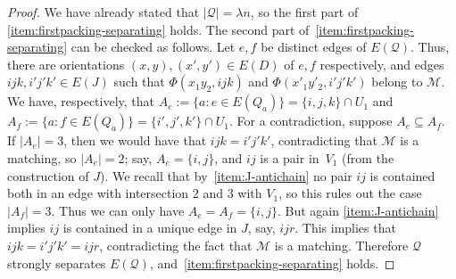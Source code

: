 \documentclass[a4paper, 11pt,reqno]{amsart}
\newcommand{\calQ}{\mathcal{Q}}
\theoremstyle{plain}
\theoremstyle{definition}
\numberwithin{equation}{section}
\begin{document}
\begin{proof}
We have already stated that $|\mathcal{Q}| = \lambda n$, so the first part of \ref{item:firstpacking-separating} holds.
The second part of~\ref{item:firstpacking-separating} can be checked as follows.
Let $e, f$ be distinct edges of $E(\calQ)$. Thus, there are orientations
$(x,y), (x',y') \in E(D)$ of $e, f$ respectively, and edges $ijk, i'j'k' \in E(J)$ 
such that $\Phi(x_1 y_2, ijk)$ and $\Phi(x'_1 y'_2, i'j'k')$ belong to $\mathcal{M}$.  
We have, respectively, that $A_e := \{ a : e \in E(Q_a) \} = \{i, j, k\} \cap U_1$
and $A_f := \{ a : f \in E(Q_a) \} = \{i', j', k'\} \cap U_1$.
For a contradiction, suppose $A_e \subseteq A_f$. If $|A_e| = 3$, then 
we would have that $ijk = i'j'k'$, contradicting that $\mathcal{M}$ 
is a matching, so $|A_e| = 2$; say, $A_e = \{i, j\}$, and $ij$ is a
pair in~$V_1$ (from the construction of $J$).  We recall that
by~\ref{item:J-antichain} no pair $ij$ is contained both in an edge
with intersection $2$ and $3$ with $V_1$, so this rules out the case
$|A_f| = 3$.  Thus we can only have $A_e = A_f = \{i,j\}$.  But
again \ref{item:J-antichain} implies $ij$ is contained in a unique
edge in $J$, say, $ijr$.  This implies that $ijk = i'j'k' = ijr$,
contradicting the fact that $\mathcal{M}$ is a matching.
Therefore $\calQ$ strongly separates $E(\calQ)$, and~\ref{item:firstpacking-separating} holds.


\end{proof}
\end{document}

